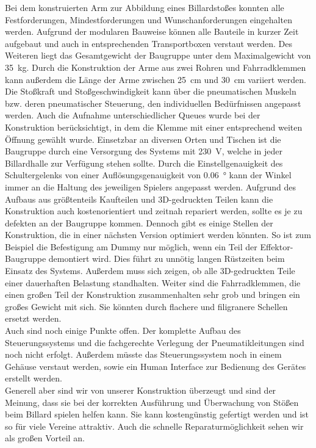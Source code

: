 	Bei dem konstruierten Arm zur Abbildung eines Billardstoßes konnten alle Festforderungen, Mindestforderungen und Wunschanforderungen eingehalten werden.
	Aufgrund der modularen Bauweise können alle Bauteile in kurzer Zeit aufgebaut und auch in entsprechenden Transportboxen verstaut werden.
	Des Weiteren liegt das Gesamtgewicht der Baugruppe unter dem Maximalgewicht von \SI{35}{\kilo\gram}.
	Durch die Konstruktion der Arme aus zwei Rohren und Fahrradklemmen kann außerdem die Länge der Arme zwischen \SI{25}{\cm} und \SI{30}{\cm} variiert werden.
	Die Stoßkraft und Stoßgeschwindigkeit kann über die pneumatischen Muskeln bzw. deren pneumatischer Steuerung, den individuellen Bedürfnissen angepasst werden.
	Auch die Aufnahme unterschiedlicher Queues wurde bei der Konstruktion berücksichtigt, in dem die Klemme mit einer entsprechend weiten Öffnung gewählt wurde.
	Einsetzbar an diversen Orten und Tischen ist die Baugruppe durch eine Versorgung des Systems mit \SI{230}{\volt}, welche in jeder Billardhalle zur Verfügung stehen sollte. 
	Durch die Einstellgenauigkeit des Schultergelenks von einer Auflösungsgenauigkeit von \SI{0,06}{\degree} kann der Winkel immer an die Haltung des jeweiligen Spielers angepasst werden.
	Aufgrund des Aufbaus aus größtenteils Kaufteilen und 3D-gedruckten Teilen kann die Konstruktion auch kostenorientiert und zeitnah repariert werden, sollte es je zu defekten an der Baugruppe kommen.
	Dennoch gibt es einige Stellen der Konstruktion, die in einer nächsten Version optimiert werden könnten.
	So ist zum Beispiel die Befestigung am Dummy nur möglich, wenn ein Teil der Effektor-Baugruppe demontiert wird.
	Dies führt zu unnötig langen Rüstzeiten beim Einsatz des Systems.
	Außerdem muss sich zeigen, ob alle 3D-gedruckten Teile einer dauerhaften Belastung standhalten.
	Weiter sind die Fahrradklemmen, die einen großen Teil der Konstruktion zusammenhalten sehr grob und bringen ein großes Gewicht mit sich.
	Sie könnten durch flachere und filigranere Schellen ersetzt werden. \\
	Auch sind noch einige Punkte offen.
	Der komplette Aufbau des Steuerungssystems und die fachgerechte Verlegung der Pneumatikleitungen sind noch nicht erfolgt. 
	Außerdem müsste das Steuerungssystem noch in einem Gehäuse verstaut werden, sowie ein Human Interface zur Bedienung des Gerätes erstellt werden. \\
	Generell aber sind wir von unserer Konstruktion überzeugt und sind der Meinung, dass sie bei der korrekten Ausführung und Überwachung von Stößen beim Billard spielen helfen kann. 
	Sie kann kostengünstig gefertigt werden und ist so für viele Vereine attraktiv.
	Auch die schnelle Reparaturmöglichkeit sehen wir als großen Vorteil an.